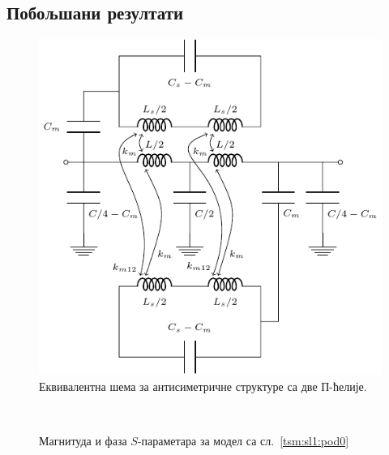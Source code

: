 \subsection{Побољшани резултати}
\begin{figure}
    \begin{center}
        \includegraphics[scale=1]{sl_tsm/ekv2cel.pdf}
    \caption{Еквивалентна шема за антисиметричне структуре са две П-ћелије.}
    \label{tsm:sl:ekv2cel}
  \end{center}
\end{figure}
\begin{figure}[!t]
\centering
{}\\
\caption{Магнитуда и фаза $S$-параметара за модел са сл.~\ref{tsm:sl1:pod0}}
\label{tsm:rez:pod0}
\end{figure}

